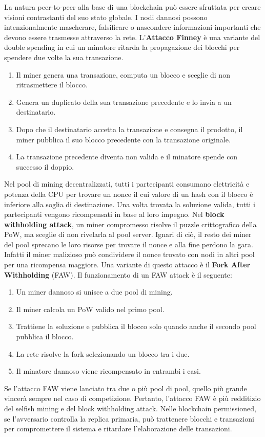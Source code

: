 La natura peer-to-peer alla base di una blockchain può essere sfruttata per creare visioni contrastanti del suo stato globale. I nodi dannosi possono intenzionalmente mascherare, falsificare o nascondere informazioni importanti che devono essere trasmesse attraverso la rete. L'\textbf{Attacco Finney} è una variante del double spending in cui un minatore ritarda la propagazione dei blocchi per spendere due volte la sua transazione.
\begin{enumerate}
    \item Il miner genera una transazione, computa un blocco e sceglie di non ritrasmettere il blocco.
    \item Genera un duplicato della sua transazione precedente e lo invia a un destinatario.
    \item Dopo che il destinatario accetta la transazione e consegna il prodotto, il miner pubblica il suo blocco precedente con la transazione originale.
    \item La transazione precedente diventa non valida e il minatore spende con successo il doppio.
\end{enumerate}
Nel pool di mining decentralizzati, tutti i partecipanti consumano elettricità e potenza della CPU per trovare un nonce il cui valore di un hash con il blocco è inferiore alla soglia di destinazione. Una volta trovata la soluzione valida, tutti i partecipanti vengono ricompensati in base al loro impegno. Nel \textbf{block withholding attack}, un miner compromesso risolve il puzzle crittografico della PoW, ma sceglie di non rivelarla al pool server. Ignari di ciò, il resto dei miner del pool sprecano le loro risorse per trovare il nonce e alla fine perdono la gara. Infatti il miner malizioso può condividere il nonce trovato con nodi in altri pool per una ricompensa maggiore. Una variante di questo attacco è il \textbf{Fork After Withholding} (FAW). Il funzionamento di un FAW attack è il seguente:
\begin{enumerate}
    \item Un miner dannoso si unisce a due pool di mining.
    \item Il miner calcola un PoW valido nel primo pool.
    \item Trattiene la soluzione e pubblica il blocco solo quando anche il secondo pool pubblica il blocco.
    \item La rete risolve la fork selezionando un blocco tra i due.
    \item Il minatore dannoso viene ricompensato in entrambi i casi.
\end{enumerate}
Se l'attacco FAW viene lanciato tra due o più pool di pool, quello più grande vincerà sempre nel caso di competizione. Pertanto, l'attacco FAW è più redditizio del selfish mining e del block withholding attack. Nelle blockchain permissioned, se l'avversario controlla la replica primaria, può trattenere blocchi e transazioni per compromettere il sistema e ritardare l'elaborazione delle transazioni.


